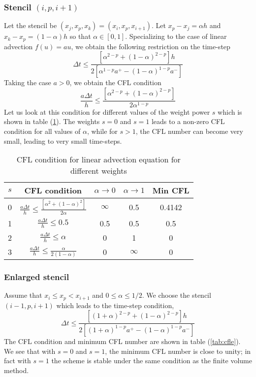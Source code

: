 \documentclass[11pt]{amsart}
\begin{document}
\subsubsection{Stencil $(i,p,i+1)$}
Let the stencil be $(x_j, x_p, x_k) = (x_i, x_p, x_{i+1})$.  Let $x_p - x_j = \alpha h$ and $x_k - x_p = (1-\alpha)h$ so that $\alpha \in [0,1]$.  Specializing to the case of linear advection $f(u) = au$, we obtain the following restriction on the time-step
\begin{equation}
\Delta t \le \frac{[  \alpha^{2-p} + (1-\alpha)^{2-p} ] h}{ 2[\alpha^{1-p} a^+ - (1-\alpha)^{1-p} a^-]}
\end{equation}
Taking the case $a > 0$, we obtain the CFL condition
\begin{equation}
\frac{a \Delta t}{h} \le \frac{[  \alpha^{2-p} + (1-\alpha)^{2-p} ] }{2 \alpha^{1-p} }
\end{equation}
Let us look at this condition for different values of the weight power $s$ which is shown in table (\ref{tab:cfl}). The weights $s=0$ and $s=1$ leads to a non-zero CFL condition for all values of $\alpha$, while for $s >1$, the CFL number can become very small, leading to very small time-steps. 
\begin{table}[htdp]
\begin{center}
\begin{tabular}{|c|c|c|c|c|}
\hline
$s$ & CFL condition & $\alpha \rightarrow 0$ & $\alpha \rightarrow 1$ & Min CFL \\
\hline
0 & $\frac{a\Delta t}{h} \le \frac{[\alpha^2 + (1-\alpha)^2]}{2\alpha}$ & $\infty$ & 0.5 & 0.4142 \\
\hline
1 & $\frac{a\Delta t}{h} \le 0.5$ & 0.5 & 0.5 & 0.5 \\
\hline
2 & $\frac{a\Delta t}{h} \le \alpha$ & 0 & 1 & 0 \\
\hline
3 & $\frac{a\Delta t}{h} \le \frac{\alpha}{2(1-\alpha)}$ & 0 & $\infty$ & 0\\
\hline
\end{tabular}
\end{center}
\caption{CFL condition for linear advection equation for different weights}
\label{tab:cfl}
\end{table}%

\subsubsection{Enlarged stencil}
Assume that $x_i \le x_p < x_{i+1}$ and $0 \le \alpha \le 1/2$. We choose the stencil $(i-1, p, i+1)$ which leads to the time-step condition,
\begin{equation}
\Delta t \le \frac{[  (1+\alpha)^{2-p} + (1-\alpha)^{2-p} ] h}{ 2[(1+\alpha)^{1-p} a^+ - (1-\alpha)^{1-p} a^-]}
\end{equation}
The CFL condition and minimum CFL number are shown in table (\ref{tab:cfle}). We see that with $s=0$ and $s=1$, the minimum CFL number is close to unity; in fact with $s=1$ the scheme is stable under the same condition as the finite volume method.
\end{document}
